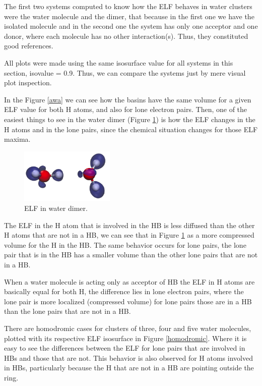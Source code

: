 The first two systems computed to know how the ELF behaves in water
clusters were the water molecule and the dimer, that because in
the first one we have the isolated molecule and in the second one the
system has only one acceptor and one donor, where each molecule has no other
interaction(s). Thus, they constituted good references.

All plots were made using the same isosurface value for all systems
in this section, isovalue = 0.9. Thus, we can compare the systems
just by mere visual plot inspection.

In the Figure \ref{awa} we can see how the basins have the same volume for a
given ELF value for both H atoms, and also for lone electron pairs. Then,
one of the easiest things to see in the water dimer (Figure \ref{dimer}) is how
the ELF changes in the H atoms and in the lone pairs, since the chemical
situation changes for those ELF maxima.

\begin{figure}
  \centering
  \includegraphics[width=0.4\textwidth]{4/plots/elf/new/dimerELF.png}
  \caption{ELF in water dimer.}
  \label{dimer}
\end{figure}

The ELF in the H atom that is involved in the HB is less diffused than the
other H atoms that are not in a HB, we can see that in Figure \ref{dimer} as a
more compressed volume for the H in the HB.  The same behavior occurs for lone
pairs, the lone pair that is in the HB has a smaller volume than the other lone
pairs that are not in a HB.

When a water molecule is acting only as acceptor of HB the ELF in H atoms are
basically equal for both H, the difference lies in lone electron pairs, where
the lone pair is more localized (compressed volume) for lone pairs those are in
a HB than the lone pairs that are not in a HB.

There are homodromic cases for clusters of three, four and five water
molecules, plotted with its respective ELF isosurface in Figure \ref{homodromic}.
Where it is easy to see the differences between the ELF for lone
pairs that are involved in HBs and those that are not. This behavior is also
observed for H atoms involved in HBs, particularly because the H that are not
in a HB are pointing outside the ring.

